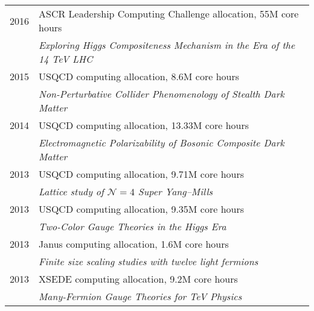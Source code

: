 \begin{spacelist}
\begin{tabular}[t]{cl}
      2016 & ASCR Leadership Computing Challenge allocation, 55M core hours                                       \\ %
           & \textit{Exploring Higgs Compositeness Mechanism in the Era of the 14 TeV LHC}                        \\[6 pt]
      2015 & USQCD computing allocation, 8.6M core hours                                                          \\ %
           & \textit{Non-Perturbative Collider Phenomenology of Stealth Dark Matter}                              \\[6 pt]
      2014 & USQCD computing allocation, 13.33M core hours                                                        \\ %
           & \textit{Electromagnetic Polarizability of Bosonic Composite Dark Matter}                             \\[6 pt]
      2013 & USQCD computing allocation, 9.71M core hours                                                         \\ %
           & \textit{Lattice study of $\mathcal N = 4$ Super Yang--Mills}                                         \\[6 pt]
      2013 & USQCD computing allocation, 9.35M core hours                                                         \\ %
           & \textit{Two-Color Gauge Theories in the Higgs Era}                                                   \\[6 pt]
      2013 & Janus computing allocation, 1.6M core hours                                                          \\ %
           & \textit{Finite size scaling studies with twelve light fermions}                                      \\[6 pt]
      2013 & XSEDE computing allocation, 9.2M core hours                                                          \\ %
           & \textit{Many-Fermion Gauge Theories for TeV Physics}                                                 \\[6 pt]

\end{tabular}
\end{spacelist}
